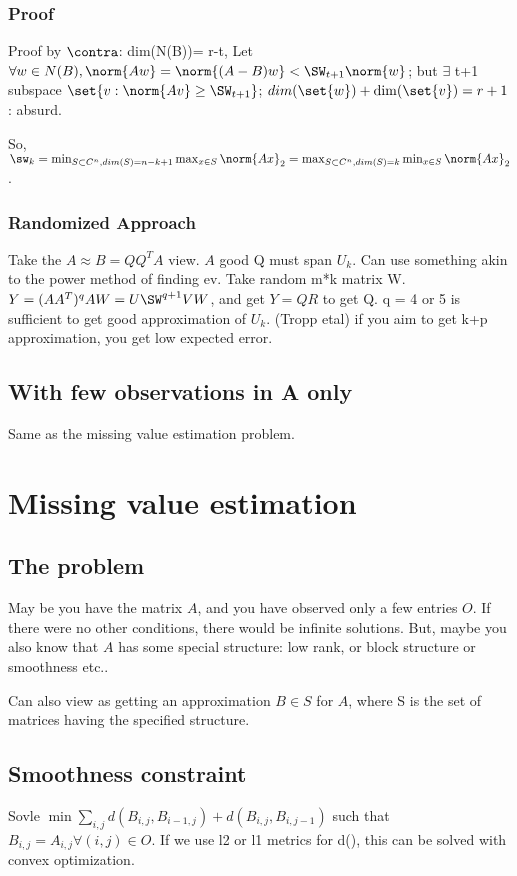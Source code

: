 \documentclass[oneside, article]{memoir}
\begin{document}
\subsubsection{Proof}
Proof by $\contra$: dim(N(B))= r-t, Let $\forall w \in N(B), \norm{Aw} = \norm{(A-B)w} < \SW_{t+1}\norm{w}$; but $\exists$ t+1 subspace $\set{v: \norm{Av}\geq \SW_{t+1}}$; $dim(\set{w})+\dim(\set{v}) = r+1$: absurd.

So, $\sw_{k} = \min_{S \subset C^{n}, dim(S) = n-k+1} \max_{x \in S} \norm{Ax}_{2} \\
= \max_{S \subset C^{n}, dim(S) = k} \min_{x \in S} \norm{Ax}_{2}$.

\subsubsection{Randomized Approach}
Take the $A \approx B = QQ^{T}A$ view. $A$ good Q must span $U_k$. Can use something akin to the power method of finding ev. Take random m*k matrix W. $Y = (AA^{T})^{q}AW = U\SW^{q+1}VW$, and get $Y = QR$ to get Q. q = 4 or 5 is sufficient to get good approximation of $U_k$. (Tropp etal) if you aim to get k+p approximation, you get low expected error.
  
\subsection{With few observations in A only}
Same as the missing value estimation problem.

\section{Missing value estimation}
\subsection{The problem}
May be you have the matrix $A$, and you have observed only a few entries $O$. If there were no other conditions, there would be infinite solutions. But, maybe you also know that $A$ has some special structure: low rank, or block structure or smoothness etc..

Can also view as getting an approximation $B \in S$ for $A$, where S is the set of matrices having the specified structure.

\subsection{Smoothness constraint}
Sovle $\min \sum_{i,j} d(B_{i, j}, B_{i-1,j}) + d(B_{i, j}, B_{i,j-1})$ such that $B_{i,j} = A_{i,j} \forall (i,j) \in O$. If we use l2 or l1 metrics for d(), this can be solved with convex optimization.
\end{document}
